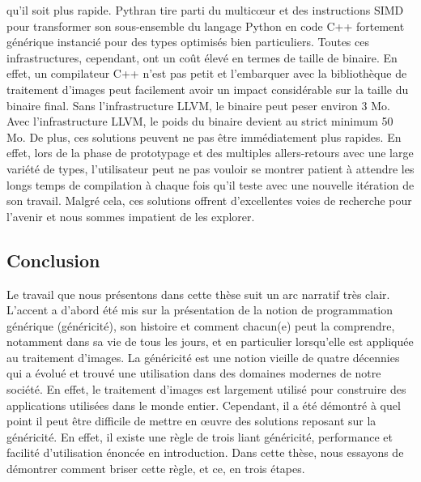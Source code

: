 qu'il soit plus rapide. Pythran tire parti du multic\oe{}ur et des instructions SIMD pour transformer son sous-ensemble
du langage Python en code C++ fortement générique instancié pour des types optimisés bien particuliers. Toutes ces
infrastructures, cependant, ont un coût élevé en termes de taille de binaire. En effet, un compilateur C++ n'est pas
petit et l'embarquer avec la bibliothèque de traitement d'images peut facilement avoir un impact considérable sur la
taille du binaire final. Sans l'infrastructure LLVM, le binaire peut peser environ 3 Mo. Avec l'infrastructure LLVM, le
poids du binaire devient au strict minimum 50 Mo. De plus, ces solutions peuvent ne pas être immédiatement plus rapides.
En effet, lors de la phase de prototypage et des multiples allers-retours avec une large variété de types, l'utilisateur
peut ne pas vouloir se montrer patient à attendre les longs temps de compilation à chaque fois qu'il teste avec une
nouvelle itération de son travail. Malgré cela, ces solutions offrent d'excellentes voies de recherche pour l'avenir et
nous sommes impatient de les explorer.


\subsection*{Conclusion}


Le travail que nous présentons dans cette thèse suit un arc narratif très clair. L'accent a d'abord été mis sur la
présentation de la notion de programmation générique (généricité), son histoire et comment chacun(e) peut la comprendre,
notamment dans sa vie de tous les jours, et en particulier lorsqu'elle est appliquée au traitement d'images. La
généricité est une notion vieille de quatre décennies qui a évolué et trouvé une utilisation dans des domaines modernes
de notre société. En effet, le traitement d'images est largement utilisé pour construire des applications utilisées dans
le monde entier. Cependant, il a été démontré à quel point il peut être difficile de mettre en \oe{}uvre des solutions
reposant sur la généricité. En effet, il existe une règle de trois liant généricité, performance et facilité
d'utilisation énoncée en introduction. Dans cette thèse, nous essayons de démontrer comment briser cette règle, et ce,
en trois étapes.

